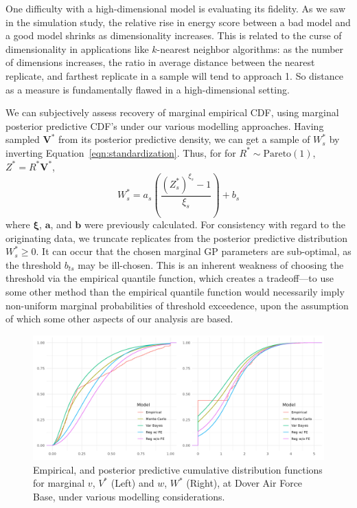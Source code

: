 One difficulty with a high-dimensional model is evaluating its fidelity.  As we saw in the simulation
    study, the relative rise in energy score between a bad model and a good model shrinks as
    dimensionality increases.  This is related to the curse of dimensionality in applications like
    $k$-nearest neighbor algorithms: as the number of dimensions increases, the ratio in average
    distance between the nearest replicate, and farthest replicate in a sample will tend to approach 1.
    So distance as a measure is fundamentally flawed in a high-dimensional setting.

We can subjectively assess recovery of marginal empirical CDF, using marginal
    posterior predictive CDF's under our various modelling approaches.
    Having sampled $\bm{V}^{*}$ from its posterior predictive density, we can get a sample of $W_s^*$
    by inverting Equation~\eqref{eqn:standardization}.  Thus, for for $R^*\sim\text{Pareto}(1)$, 
    $Z^* = R^*\bm{V}^*$,
    \begin{equation*}
        W_s^* = a_s\left(\frac{(Z_s^*)^{\xi_s} - 1}{\xi_s}\right) + b_s
    \end{equation*}
    where $\bm{\xi}$, $\bm{a}$, and $\bm{b}$ were previously calculated.  
    For consistency with regard to the originating data, we truncate replicates 
    from the posterior predictive distribution $W_{s}^* \geq 0$.  
    It can occur that the chosen marginal GP parameters are sub-optimal, as the threshold
    $b_{ts}$ may be ill-chosen.  This is an inherent weakness of choosing
    the threshold via the empirical quantile function, which creates a 
    tradeoff---to use some other method than the empirical quantile function would necessarily imply 
    non-uniform marginal probabilities of threshold exceedence, upon the assumption of which some other 
    aspects of our analysis are based. 

\begin{figure}[ht]
    \caption{Empirical, and posterior predictive cumulative distribution functions for marginal 
    $v$, $V^*$ (Left) and $w$, $W^*$ (Right), at Dover Air Force Base, under various modelling
    considerations.\label{plot:marginal_doverafb}}
    \centering
    \includegraphics[width=\textwidth]{./plots/delaware_marginal_dover_afb.png}
\end{figure}

